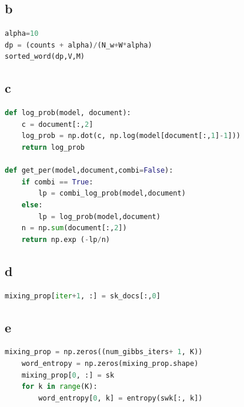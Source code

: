 \documentclass[twoside,twocolumn]{article}
\begin{document}
\subsection{b}
\begin{lstlisting}[language=python]
alpha=10
dp = (counts + alpha)/(N_w+W*alpha)
sorted_word(dp,V,M)
\end{lstlisting}


\subsection{c}
\begin{lstlisting}[language=python]
def log_prob(model, document):
    c = document[:,2]
    log_prob = np.dot(c, np.log(model[document[:,1]-1])) 
    return log_prob

def get_per(model,document,combi=False):
    if combi == True:
        lp = combi_log_prob(model,document)
    else:
        lp = log_prob(model,document)
    n = np.sum(document[:,2])
    return np.exp (-lp/n)
\end{lstlisting}


\subsection{d}
\begin{lstlisting}[language=python]
mixing_prop[iter+1, :] = sk_docs[:,0]
\end{lstlisting}

\subsection{e}
\begin{lstlisting}[language=python]
mixing_prop = np.zeros((num_gibbs_iters+ 1, K))
    word_entropy = np.zeros(mixing_prop.shape)
    mixing_prop[0, :] = sk
    for k in range(K):
        word_entropy[0, k] = entropy(swk[:, k])

\end{lstlisting}

\end{document}
